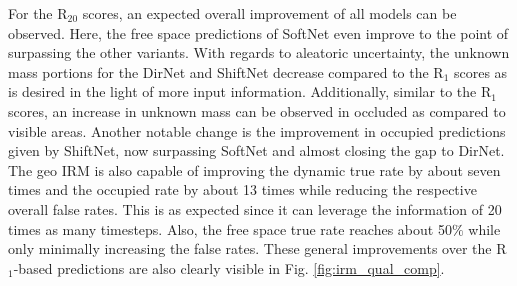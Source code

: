 For the R$_{20}$ scores, an expected overall improvement of all models can be observed. Here, the free space predictions of SoftNet even improve to the point of surpassing the other variants. With regards to aleatoric uncertainty, the unknown mass portions for the DirNet and ShiftNet decrease compared to the R$_1$ scores as is desired in the light of more input information. Additionally, similar to the R$_1$ scores, an increase in unknown mass can be observed in occluded as compared to visible areas. Another notable change is the improvement in occupied predictions given by ShiftNet, now surpassing SoftNet and almost closing the gap to DirNet. The geo IRM is also capable of improving the dynamic true rate by about seven times and the occupied rate by about 13 times while reducing the respective overall false rates. This is as expected since it can leverage the information of 20 times as many timesteps. Also, the free space true rate reaches about 50$\%$ while only minimally increasing the false rates. These general improvements over the R$_1$-based predictions are also clearly visible in Fig. \ref{fig:irm_qual_comp}.
